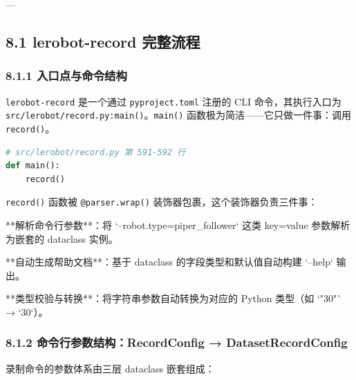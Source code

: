 \documentclass[UTF8,a4paper,11pt]{ctexart}
\begin{document}
{---

\subsection{8.1 lerobot-record 完整流程}

\subsubsection{8.1.1 入口点与命令结构}

\texttt{lerobot-record} 是一个通过 \texttt{pyproject.toml} 注册的 CLI 命令，其执行入口为 \texttt{src/lerobot/record.py:main()}。\texttt{main()} 函数极为简洁——它只做一件事：调用 \texttt{record()}。

\begin{lstlisting}[language=python]
# src/lerobot/record.py 第 591-592 行
def main():
    record()
\end{lstlisting}

\texttt{record()} 函数被 \texttt{@parser.wrap()} 装饰器包裹，这个装饰器负责三件事：

\item[1] **解析命令行参数**：将 `--robot.type=piper_follower` 这类 key=value 参数解析为嵌套的 dataclass 实例。
\item[2] **自动生成帮助文档**：基于 dataclass 的字段类型和默认值自动构建 `--help` 输出。
\item[3] **类型校验与转换**：将字符串参数自动转换为对应的 Python 类型（如 `"30"` → `30`）。

\subsubsection{8.1.2 命令行参数结构：RecordConfig → DatasetRecordConfig}

录制命令的参数体系由三层 dataclass 嵌套组成：

}
\end{document}
